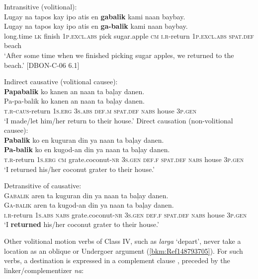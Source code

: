 \ea
\label{bkm:Ref148946728}
Intransitive (volitional): \\
Lugay  na  tapos  kay  ipo  atis  en \textbf{gabalik}  kami  naan  baybay. \\\smallskip
\gll Lugay  na  tapos  kay  ipo  atis  en \textbf{ga-balik}  kami  naan  baybay. \\
long.time  \textsc{lk}  finish  1\textsc{p.excl.abs}  pick  sugar.apple  \textsc{cm}
\textsc{i.r}-return  1\textsc{p.excl.abs}  \textsc{spat.def}  beach \\
\glt ‘After some time when we finished picking sugar apples, we returned to the beach.’ [DBON-C-06 6.1]
\z

\ea
\label{bkm:Ref148968257}
Indirect causative (volitional causee): \\
  \textbf{Papabalik} ko kanen an naan ta baļay danen. \\\smallskip
\gll  Pa-pa-balik  ko  kanen  an  naan  ta  baļay  danen. \\
  \textsc{t.r}-\textsc{caus}-return  1\textsc{s.erg}  3\textsc{s.abs}  \textsc{def.m}  \textsc{spat.def}  \textsc{nabs}  house  3\textsc{p.gen} \\
\glt  ‘I made/let him/her return to their house.’
\z
\ea
\label{bkm:Ref148946793}
Direct causation (non-volitional causee):\\
\textbf{Pabalik}  ko  en  kuguran  din  ya  naan  ta  baļay  danen. \\\smallskip
\gll \textbf{Pa-balik}  ko  en  kugod-an  din  ya  naan  ta  baļay  danen. \\
\textsc{t.r}-return  1\textsc{s.erg}  \textsc{cm}  grate.coconut-\textsc{nr}  3\textsc{s.gen}  \textsc{def.f}  \textsc{spat.def}  \textsc{nabs}  house  3\textsc{p.gen} \\
\glt ‘I returned his/her coconut grater to their house.’
\z

\ea
\label{bkm:Ref148946893}
Detransitive of causative: \\
\textsc{Gabalik}  aren  ta  kuguran  din  ya  naan  ta baļay  danen. \\\smallskip
\gll \textsc{Ga-balik}  aren  ta  kugod-an  din  ya  naan  ta baļay  danen. \\
\textsc{i.r}-return  1\textsc{s.abs}  \textsc{nabs}  grate.coconut-\textsc{nr}  3\textsc{s.gen}  \textsc{def.f}  \textsc{spat.def}  \textsc{nabs}  house  3\textsc{p.gen} \\
\glt ‘I \textbf{returned} his/her coconut grater to their house.’
\z

Other volitional motion verbs of Class IV, such as \textit{larga} ‘depart’, never take a location as an oblique or Undergoer argument (\ref{bkm:Ref148793705}). For such verbs, a destination is expressed in a complement clause , preceded by the linker/complementizer \textit{na}:

